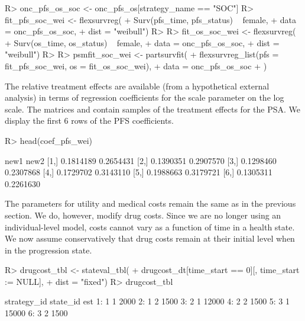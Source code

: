 \documentclass[article, nojss]{jss}\usepackage[]{graphicx}\usepackage[]{color}
\begin{document}
\begin{Schunk}
\begin{Sinput}
R> onc_pfs_os_soc <- onc_pfs_os[strategy_name == "SOC"]
R> fit_pfs_soc_wei <- flexsurvreg(
+    Surv(pfs_time, pfs_status) ~ female,
+    data = onc_pfs_os_soc,
+    dist = "weibull")
R> 
R> fit_os_soc_wei <- flexsurvreg(
+    Surv(os_time, os_status) ~  female,
+    data = onc_pfs_os_soc,
+    dist = "weibull")
R> 
R> psmfit_soc_wei <- partsurvfit(
+    flexsurvreg_list(pfs = fit_pfs_soc_wei, os = fit_os_soc_wei),
+    data = onc_pfs_os_soc
+  )
\end{Sinput}
\end{Schunk}

The relative treatment effects are available (from a hypothetical external analysis) in terms of regression coefficients for the scale parameter on the log scale. The matrices  and  contain samples of the treatment effects for the PSA. We display the first 6 rows of the PFS coefficients. 



\begin{Schunk}
\begin{Sinput}
R> head(coef_pfs_wei)
\end{Sinput}
\begin{Soutput}
          new1      new2
[1,] 0.1814189 0.2654431
[2,] 0.1390351 0.2907570
[3,] 0.1298460 0.2307868
[4,] 0.1729702 0.3143110
[5,] 0.1988663 0.3179721
[6,] 0.1305311 0.2261630
\end{Soutput}
\end{Schunk}

The parameters for utility and medical costs remain the same as in the previous section. We do, however, modify drug costs. Since we are no longer using an individual-level model, costs cannot vary as a function of time in a health state. We now assume conservatively that drug costs remain at their initial level when in the progression state.  

\begin{Schunk}
\begin{Sinput}
R> drugcost_tbl <- stateval_tbl(
+    drugcost_dt[time_start ==  0][, time_start := NULL],
+    dist = "fixed")
R> drugcost_tbl
\end{Sinput}
\begin{Soutput}
   strategy_id state_id   est
1:           1        1  2000
2:           1        2  1500
3:           2        1 12000
4:           2        2  1500
5:           3        1 15000
6:           3        2  1500
\end{Soutput}
\end{Schunk}
\end{document}
